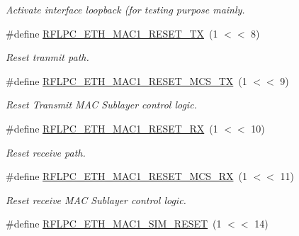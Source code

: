 \begin{DoxyCompactItemize}
\begin{DoxyCompactList}\small\item\em Activate interface loopback (for testing purpose mainly. \end{DoxyCompactList}\item 
\hypertarget{group__eth_ga708bda290539e7a4fc18f4129cb29e96}{\#define \hyperlink{group__eth_ga708bda290539e7a4fc18f4129cb29e96}{R\-F\-L\-P\-C\-\_\-\-E\-T\-H\-\_\-\-M\-A\-C1\-\_\-\-R\-E\-S\-E\-T\-\_\-\-T\-X}~(1 $<$$<$ 8)}\label{group__eth_ga708bda290539e7a4fc18f4129cb29e96}

\begin{DoxyCompactList}\small\item\em Reset tranmit path. \end{DoxyCompactList}\item 
\hypertarget{group__eth_ga5a6dbcd075853ce2cea21d136a723a9e}{\#define \hyperlink{group__eth_ga5a6dbcd075853ce2cea21d136a723a9e}{R\-F\-L\-P\-C\-\_\-\-E\-T\-H\-\_\-\-M\-A\-C1\-\_\-\-R\-E\-S\-E\-T\-\_\-\-M\-C\-S\-\_\-\-T\-X}~(1 $<$$<$ 9)}\label{group__eth_ga5a6dbcd075853ce2cea21d136a723a9e}

\begin{DoxyCompactList}\small\item\em Reset Transmit M\-A\-C Sublayer control logic. \end{DoxyCompactList}\item 
\hypertarget{group__eth_gacffd1d0c63e725d3edacb7b7e072bdd1}{\#define \hyperlink{group__eth_gacffd1d0c63e725d3edacb7b7e072bdd1}{R\-F\-L\-P\-C\-\_\-\-E\-T\-H\-\_\-\-M\-A\-C1\-\_\-\-R\-E\-S\-E\-T\-\_\-\-R\-X}~(1 $<$$<$ 10)}\label{group__eth_gacffd1d0c63e725d3edacb7b7e072bdd1}

\begin{DoxyCompactList}\small\item\em Reset receive path. \end{DoxyCompactList}\item 
\hypertarget{group__eth_gae8d87b3759dcd981fe7fb32bd6991657}{\#define \hyperlink{group__eth_gae8d87b3759dcd981fe7fb32bd6991657}{R\-F\-L\-P\-C\-\_\-\-E\-T\-H\-\_\-\-M\-A\-C1\-\_\-\-R\-E\-S\-E\-T\-\_\-\-M\-C\-S\-\_\-\-R\-X}~(1 $<$$<$ 11)}\label{group__eth_gae8d87b3759dcd981fe7fb32bd6991657}

\begin{DoxyCompactList}\small\item\em Reset receive M\-A\-C Sublayer control logic. \end{DoxyCompactList}\item 
\hypertarget{group__eth_ga7ffdf796391e597b0e37ee53f557986c}{\#define \hyperlink{group__eth_ga7ffdf796391e597b0e37ee53f557986c}{R\-F\-L\-P\-C\-\_\-\-E\-T\-H\-\_\-\-M\-A\-C1\-\_\-\-S\-I\-M\-\_\-\-R\-E\-S\-E\-T}~(1 $<$$<$ 14)}\label{group__eth_ga7ffdf796391e597b0e37ee53f557986c}


\end{DoxyCompactItemize}
